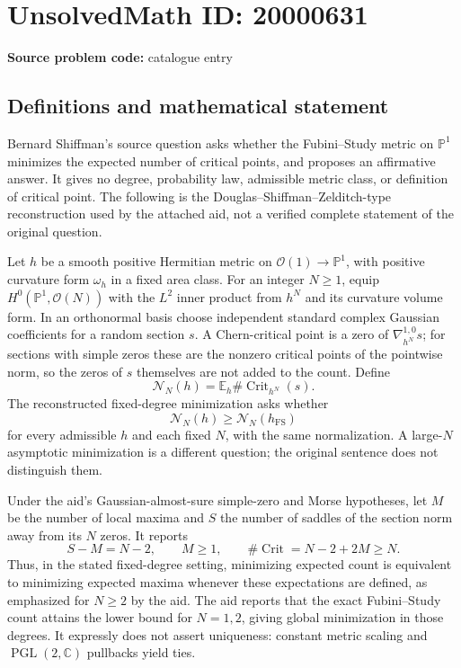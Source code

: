 \documentclass[11pt]{article}
\newcommand{\C}{\mathbb{C}}
\newcommand{\PP}{\mathbb{P}}
\begin{document}
\section*{UnsolvedMath ID: 20000631}
\textbf{Source problem code:} catalogue entry
\subsection{Definitions and mathematical statement}
Bernard Shiffman's source question asks whether the Fubini--Study metric on \(\PP^1\) minimizes the expected number of critical points, and proposes an affirmative answer. It gives no degree, probability law, admissible metric class, or definition of critical point. The following is the Douglas--Shiffman--Zelditch-type reconstruction used by the attached aid, not a verified complete statement of the original question.

Let \(h\) be a smooth positive Hermitian metric on \(\mathcal O(1)\to\PP^1\), with positive curvature form \(\omega_h\) in a fixed area class. For an integer \(N\geq1\), equip \(H^0(\PP^1,\mathcal O(N))\) with the \(L^2\) inner product from \(h^N\) and its curvature volume form. In an orthonormal basis choose independent standard complex Gaussian coefficients for a random section \(s\). A Chern-critical point is a zero of \(\nabla^{1,0}_{h^N}s\); for sections with simple zeros these are the nonzero critical points of the pointwise norm, so the zeros of \(s\) themselves are not added to the count. Define
\[
\mathcal N_N(h)=\mathbb E_h\#\operatorname{Crit}_{h^N}(s).
\]
The reconstructed fixed-degree minimization asks whether
\[
\mathcal N_N(h)\geq\mathcal N_N(h_{\mathrm{FS}})
\]
for every admissible \(h\) and each fixed \(N\), with the same normalization. A large-\(N\) asymptotic minimization is a different question; the original sentence does not distinguish them.

Under the aid's Gaussian-almost-sure simple-zero and Morse hypotheses, let \(M\) be the number of local maxima and \(S\) the number of saddles of the section norm away from its \(N\) zeros. It reports
\[
S-M=N-2,\qquad M\geq1,\qquad
\#\operatorname{Crit}=N-2+2M\geq N.
\]
Thus, in the stated fixed-degree setting, minimizing expected count is equivalent to minimizing expected maxima whenever these expectations are defined, as emphasized for \(N\geq2\) by the aid. The aid reports that the exact Fubini--Study count attains the lower bound for \(N=1,2\), giving global minimization in those degrees. It expressly does not assert uniqueness: constant metric scaling and \(\operatorname{PGL}(2,\C)\) pullbacks yield ties.
\end{document}

